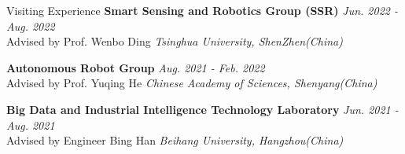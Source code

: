 \begin{rSection}{Visiting Experience}
	{\bf Smart Sensing and Robotics Group (SSR)} \hfill {\em Jun. 2022 - Aug. 2022} \\
	{Advised by Prof. Wenbo Ding} \hfill {\em Tsinghua University, ShenZhen(China)}

	{\bf Autonomous Robot Group} \hfill {\em Aug. 2021 - Feb. 2022} \\
	{Advised by Prof. Yuqing He} \hfill {\em Chinese Academy of Sciences, Shenyang(China)}
	
	{\bf Big Data and Industrial Intelligence Technology Laboratory} \hfill {\em Jun. 2021 - Aug. 2021} \\
	{Advised by Engineer Bing Han} \hfill {\em Beihang University, Hangzhou(China)}
	
\end{rSection}
